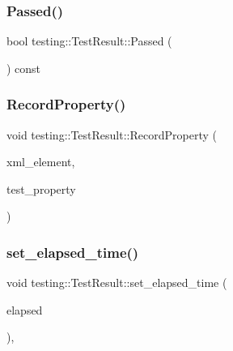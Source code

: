 \subsubsection{\texorpdfstring{Passed()}{Passed()}}
{\footnotesize\ttfamily bool testing\+::\+Test\+Result\+::\+Passed (\begin{DoxyParamCaption}{ }\end{DoxyParamCaption}) const\hspace{0.3cm}{\ttfamily [inline]}}

\mbox{\label{classtesting_1_1TestResult_ac253b0fd7ea70f457e9517e415eac32d}} 
\subsubsection{\texorpdfstring{Record\+Property()}{RecordProperty()}}
{\footnotesize\ttfamily void testing\+::\+Test\+Result\+::\+Record\+Property (\begin{DoxyParamCaption}\item[{const std\+::string \&}]{xml\+\_\+element,  }\item[{const \hyperlink{classtesting_1_1TestProperty}{Test\+Property} \&}]{test\+\_\+property }\end{DoxyParamCaption})\hspace{0.3cm}{\ttfamily [private]}}

\mbox{\label{classtesting_1_1TestResult_aa345325e5dea41609d17d7c614bf2b18}} 
\subsubsection{\texorpdfstring{set\+\_\+elapsed\+\_\+time()}{set\_elapsed\_time()}}
{\footnotesize\ttfamily void testing\+::\+Test\+Result\+::set\+\_\+elapsed\+\_\+time (\begin{DoxyParamCaption}\item[{\hyperlink{namespacetesting_a992de1d091ce660f451d1e8b3ce30fd6}{Time\+In\+Millis}}]{elapsed }\end{DoxyParamCaption})\hspace{0.3cm}{\ttfamily [inline]}, {\ttfamily [private]}}

